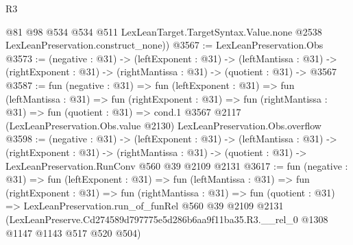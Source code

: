\begin{lexlean}{R3}
\begin{coremodule}
        @81
        @98
        @534
        @534
        @511
        LexLeanTarget.TargetSyntax.Value.none
        @2538
        LexLeanPreservation.construct_none))
@3567 := LexLeanPreservation.Obs
@3573 := (negative : @31) ->
  (leftExponent : @31) ->
  (leftMantissa : @31) ->
  (rightExponent : @31) -> (rightMantissa : @31) -> (quotient : @31) -> @3567
@3587 := fun (negative : @31) =>
  fun (leftExponent : @31) =>
  fun (leftMantissa : @31) =>
  fun (rightExponent : @31) =>
  fun (rightMantissa : @31) =>
  fun (quotient : @31) =>
  cond.{1} @3567 @2117 (LexLeanPreservation.Obs.value @2130) LexLeanPreservation.Obs.overflow
@3598 := (negative : @31) ->
  (leftExponent : @31) ->
  (leftMantissa : @31) ->
  (rightExponent : @31) ->
  (rightMantissa : @31) -> (quotient : @31) -> LexLeanPreservation.RunConv @560 @39 @2109 @2131
@3617 := fun (negative : @31) =>
  fun (leftExponent : @31) =>
  fun (leftMantissa : @31) =>
  fun (rightExponent : @31) =>
  fun (rightMantissa : @31) =>
  fun (quotient : @31) =>
  LexLeanPreservation.run_of_funRel
    @560
    @39
    @2109
    @2131
    (LexLeanPreserve.Cd274589d797775e5d286b6aa9f11ba35.R3.__rel_0 @1308 @1147 @1143 @517 @520 @504)
\end{coremodule}
\end{lexlean}
